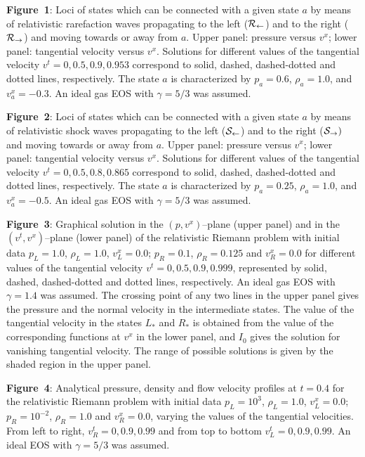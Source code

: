 {\bf Figure~1}: Loci of states which can be connected with a given state
$a$ by means of relativistic rarefaction waves propagating to the left
(${\cal R}_{\leftarrow}$) and to the right (${\cal R}_{\rightarrow}$)
and moving towards or away from $a$. Upper panel: pressure versus
$v^x$; lower panel: tangential velocity versus $v^x$. Solutions for
different values of the tangential velocity $v^t=0, 0.5, 0.9, 0.953$
correspond to solid, dashed, dashed-dotted and dotted lines,
respectively. The state $a$ is characterized by $p_a=0.6$,
$\rho_a=1.0$, and $v^x_a=-0.3$. An ideal gas EOS with $\gamma=5/3$ was
assumed.
 
{\bf Figure~2}: Loci of states which can be connected with a given state
$a$ by means of relativistic shock waves propagating to the left
(${\cal S}_{\leftarrow}$) and to the right (${\cal S}_{\rightarrow})$
and moving towards or away from $a$. Upper panel: pressure versus
$v^x$; lower panel: tangential velocity versus $v^x$. Solutions for
different values of the tangential velocity $v^t=0, 0.5, 0.8, 0.865$
correspond to solid, dashed, dashed-dotted and dotted lines,
respectively. The state $a$ is characterized by $p_a=0.25$,
$\rho_a=1.0$, and $v^x_a=-0.5$. An ideal gas EOS with $\gamma=5/3$ was
assumed.

{\bf Figure~3}: Graphical solution in the $(p,v^x)$--plane (upper
panel) and in the $(v^t,v^x)$--plane (lower panel) of the relativistic
Riemann problem with initial data $p_L=1.0$, $\rho_L=1.0$,
$v^x_L=0.0$; $p_R=0.1$, $\rho_R=0.125$ and $v^x_R=0.0$ for different
values of the tangential velocity $v^t= 0, 0.5, 0.9, 0.999$,
represented by solid, dashed, dashed-dotted and dotted lines,
respectively. An ideal gas EOS with $\gamma=1.4$ was assumed.  The
crossing point of any two lines in the upper panel gives the pressure
and the normal velocity in the intermediate states. The value of the
tangential velocity in the states $L_*$ and $R_*$ is obtained from the
value of the corresponding functions at $v^x$ in the lower panel, and
$I_0$ gives the solution for vanishing tangential velocity.  The range
of possible solutions is given by the shaded region in the upper
panel.

{\bf Figure~4}: Analytical pressure, density and flow velocity
profiles at $t=0.4$ for the relativistic Riemann problem with initial
data $p_L=10^3$, $\rho_L=1.0$, $v^x_L=0.0$; $p_R=10^{-2}$,
$\rho_R=1.0$ and $v^x_R=0.0$, varying the values of the tangential
velocities. From left to right, $v_{R}^t=0, 0.9, 0.99$ and from top to
bottom $v_{L}^t=0, 0.9, 0.99$. An ideal EOS with $\gamma=5/3$ was
assumed.

